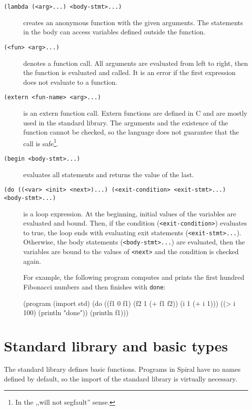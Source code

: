 \begin{description}
  \item[\texttt{(lambda (<arg>...) <body-stmt>...)}] creates an anonymous
    function with the given arguments. The statements in the body can access
    variables defined outside the function.

  \item[\texttt{(<fun> <arg>...)}] denotes a function call. All arguments are
    evaluated from left to right, then the function is evaluated and called. It
    is an error if the first expression does not evaluate to a function.

  \item[\texttt{(extern <fun-name> <arg>...)}] is an extern function call.
    Extern functions are defined in C and are mostly used in the standard
    library. The arguments and the existence of the function cannot be checked,
    so the language does not guarantee that the call is safe\footnote{In the
    ,,will not segfault'' sense.}.

  \item[\texttt{(begin <body-stmt>...)}] evaluates all statements and returns
    the value of the last.

  \item[\texttt{(do ((<var> <init> <next>)...) (<exit-condition> <exit-stmt>...)
    <body-stmt>...)}] is a loop expression. At the beginning, initial values of
    the variables are evaluated and bound. Then, if the condition
    (\texttt{<exit-condition>}) evaluates to true, the loop ends with evaluating
    exit statements (\texttt{<exit-stmt>...}). Otherwise, the body statements
    (\texttt{<body-stmt>...}) are evaluated, then the variables are bound to the
    values of \texttt{<next>} and the condition is checked again.

    For example, the following program computes and prints the first hundred
    Fibonacci numbers and then finishes with \texttt{done}:

\begin{spiral}
(program
  (import std)
  (do ((f1 0 f1)
       (f2 1 (+ f1 f2))
       (i  1 (+ i 1)))
    ((> i 100)
      (println "done"))
    (println f1)))
\end{spiral}
\end{description}

\section{Standard library and basic types}

The standard library defines basic functions. Programs in Spiral have no names
defined by default, so the import of the standard library is virtually
necessary.

